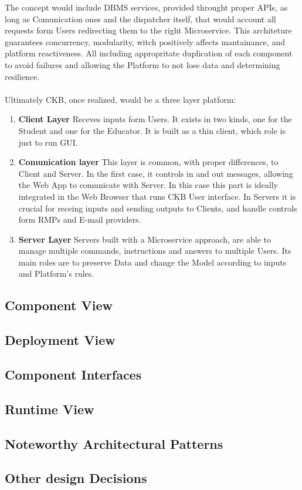 The concept would include DBMS services, provided throught proper APIs, as long as Comunication ones and the dispatcher itself, that would account all requests form Users redirecting them to the right Microservice. This architeture guarantees concurrency, modularity, witch positively affects mantainance, and platform reactiveness.
All including appropritate duplication of each component to avoid failures and allowing the Platform to not lose data and determining resilience.\\\\
Ultimately CKB, once realized, would be a three layer platform:
\begin{enumerate}
    \item \textbf{Client Layer} Receves inputs form Users. It exists in two kinds, one for the Student and one for the Educator. It is built as a thin client, which role is just to run GUI.
    \item \textbf{Comunication layer} This layer is common, with proper differences, to Client and Server. In the first case, it controls in and out messages, allowing the Web App to comunicate with Server. In this case this part is ideally integrated in the Web Browser that runs CKB User interface. In Servers it is crucial for receing inputs and sending outputs to Clients, and handle controls form RMPs and E-mail providers.
    \item \textbf{Server Layer} Servers built with a Microservice approach, are able to manage multiple commands, instructions and answers to multiple Users. Its main roles are to preserve Data and change the Model according to inputs and Platform's rules.
\end{enumerate}
\subsection{Component View}
\subsection{Deployment View}
\subsection{Component Interfaces}
\subsection{Runtime View}
\subsection{Noteworthy Architectural Patterns}
\subsection{Other design Decisions}
